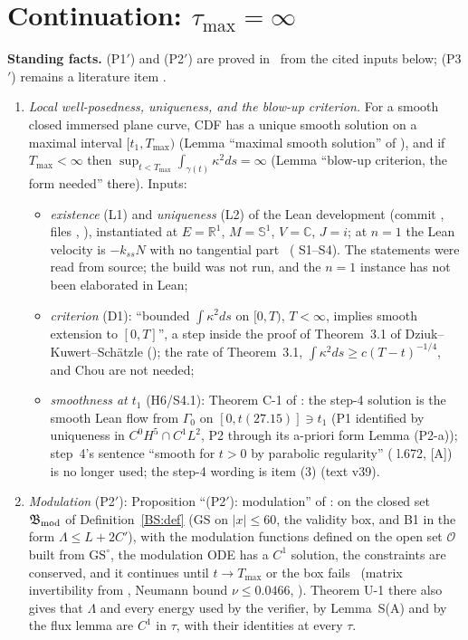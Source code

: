 \documentclass[11pt]{article}
\begin{document}
\section{Continuation: $\tau_{\max}=\infty$}\label{C:sec:cont}
\noindent\textbf{Standing facts.} (P1$'$) and (P2$'$) are proved in  \tH\ from the cited inputs below; (P3$'$) remains a literature item \tH.
\begin{enumerate}[label=(P\arabic*$'$),leftmargin=3em]
\item \emph{Local well-posedness, uniqueness, and the blow-up criterion.} For a smooth closed immersed plane curve, CDF has a unique smooth solution on a maximal interval $[t_1,T_{\max})$ (Lemma ``maximal smooth solution'' of ), and if $T_{\max}<\infty$ then $\sup_{t<T_{\max}}\int_{\gamma(t)}\kappa^2ds=\infty$ (Lemma ``blow-up criterion, the form needed'' there). Inputs:
  \begin{itemize}[leftmargin=*]
  \item \emph{existence} (L1)  and \emph{uniqueness} (L2)  of the Lean development  \cite{CWFlow} (commit , files , ), instantiated at $E=\mathbb R^1$, $M=\mathbb S^1$, $V=\mathbb C$, $J=i$; at $n=1$ the Lean velocity is $-k_{ss}N$ with no tangential part \tS\ ( S1--S4). The statements were read from source; the build was not run, and the $n=1$ instance has not been elaborated in Lean;
  \item \emph{criterion} (D1): ``bounded $\int\kappa^2ds$ on $[0,T)$, $T<\infty$, implies smooth extension to $[0,T]$'', a step inside the proof of Theorem~3.1 of Dziuk--Kuwert--Sch\"atzle \cite{DKS2002} (); the rate of Theorem~3.1, $\int\kappa^2ds\ge c(T-t)^{-1/4}$, and Chou \cite{Chou2003} are not needed;
  \item \emph{smoothness at $t_1$} (H6/S4.1): Theorem C-1 of  \tHd: the step-4 solution is the smooth Lean flow from $\Gamma_0$ on $[0,t(27.15)]\ni t_1$ (P1 identified by uniqueness in $C^0H^5\cap C^1L^2$, P2 through its a-priori form Lemma (P2-a)); step~4's sentence ``smooth for $t>0$ by parabolic regularity'' ( l.672, [A]) is no longer used; the step-4 wording is  item (3) (text v39).
  \end{itemize}
\item \emph{Modulation} (P2$'$): Proposition ``(P2$'$): modulation'' of : on the closed set $\mathfrak B_{\rm mod}$ of Definition~\ref{BS:def} (GS on $|x|\le60$, the validity box, and B1 in the form $\Lambda\le L+2C'$), with the modulation functions defined on the open set $\mathcal O$ built from $\mathrm{GS}^\circ$, the modulation ODE has a $C^1$ solution, the constraints are conserved, and it continues until $t\to T_{\max}$ or the box fails \tH\ (matrix invertibility from , Neumann bound $\nu\le0.0466$, \tR). Theorem U-1 there also gives that $\Lambda$ and every energy used by the verifier, by Lemma~S(A) and by the flux lemma are $C^1$ in $\tau$, with their identities at every $\tau$.

\end{enumerate}
\end{document}
